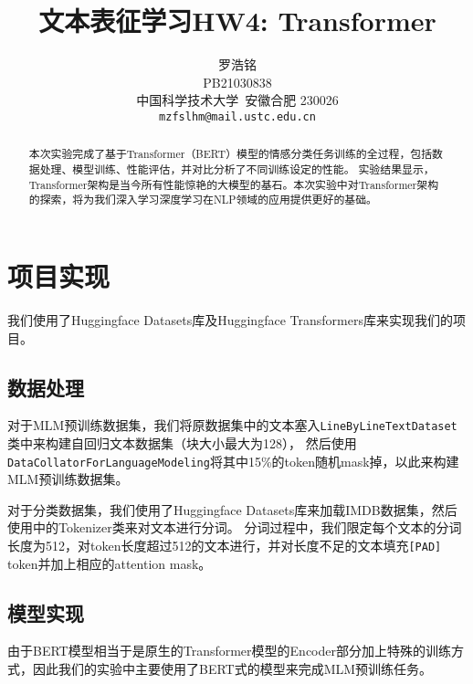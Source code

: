 \documentclass{article}
\title{文本表征学习HW4: Transformer}
\author{
  罗浩铭 \\
  PB21030838\\
  中国科学技术大学\ 安徽合肥 230026 \\
  \texttt{mzfslhm@mail.ustc.edu.cn} \\
}
\begin{document}
\maketitle


\begin{abstract}
  本次实验完成了基于Transformer（BERT）模型的情感分类任务训练的全过程，包括数据处理、模型训练、性能评估，并对比分析了不同训练设定的性能。
  实验结果显示，
  Transformer架构是当今所有性能惊艳的大模型的基石。本次实验中对Transformer架构的探索，将为我们深入学习深度学习在NLP领域的应用提供更好的基础。
\end{abstract}





\section{项目实现}
我们使用了Huggingface Datasets库及Huggingface Transformers库来实现我们的项目。
\subsection{数据处理}
对于MLM预训练数据集，我们将原数据集中的文本塞入\verb|LineByLineTextDataset|类中来构建自回归文本数据集（块大小最大为128），
然后使用\verb|DataCollatorForLanguageModeling|将其中15\%的token随机mask掉，以此来构建MLM预训练数据集。

对于分类数据集，我们使用了Huggingface Datasets库来加载IMDB数据集，然后使用中的Tokenizer类来对文本进行分词。
分词过程中，我们限定每个文本的分词长度为512，对token长度超过512的文本进行，并对长度不足的文本填充\verb|[PAD]| token并加上相应的attention mask。


\subsection{模型实现}
由于BERT模型相当于是原生的Transformer模型的Encoder部分加上特殊的训练方式，因此我们的实验中主要使用了BERT式的模型来完成MLM预训练任务。
\end{document}

